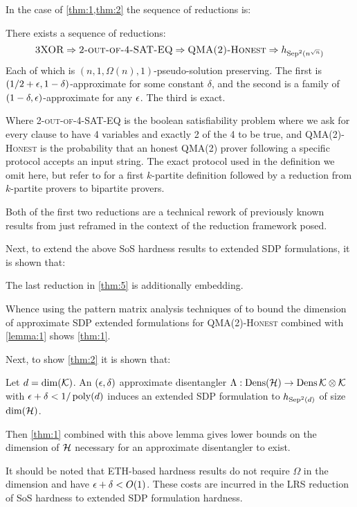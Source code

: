 \documentclass[runningheads,a4paper,english]{llncs}[2022/01/12]
\begin{document}
In the case of \cref{thm:1,thm:2} the sequence of reductions is:
\begin{theorem}\label{thm:5}
  There exists a sequence of reductions:
  \[\textsc{3XOR} \Rightarrow \textsc{2-out-of-4-SAT-EQ} \Rightarrow \textsc{QMA(2)-Honest} \Rightarrow h_{\operatorname{Sep}^2(n^{\sqrt{n}})}\]
  Each of which is $(n, 1, \Omega(n), 1)$-pseudo-solution preserving.
  The first is $(1/2+\epsilon, 1-\delta)$-approximate for some constant $\delta$, and the second is a family of $(1-\delta, \epsilon)$-approximate for any $\epsilon$. The third is exact.
\end{theorem}
Where \textsc{2-out-of-4-SAT-EQ} is the boolean satisfiability problem where we ask for every clause to have 4 variables and exactly 2 of the 4 to be true, and \textsc{QMA(2)-Honest} is the probability that an honest QMA(2) prover following a specific protocol accepts an input string.
The exact protocol used in the definition we omit here, but refer to \cite{aaronson2008powerunentanglement,harrow2013testing} for a first $k$-partite definition followed by a reduction from $k$-partite provers to bipartite provers.

Both of the first two reductions are a technical rework of previously known results from \cite{aaronson2008powerunentanglement,harrow2013testing} just reframed in the context of the reduction framework posed.

Next, to extend the above SoS hardness results to extended SDP formulations, it is shown that:
\begin{lemma}\label{lemma:1}
  The last reduction in \cref{thm:5} is additionally embedding.
\end{lemma}
Whence using the pattern matrix analysis techniques of \cite{lee2014lowerboundssizesemidefinite} to bound the dimension of approximate SDP extended formulations for \textsc{QMA(2)-Honest} combined with \cref{lemma:1} shows \cref{thm:1}.

Next, to show \cref{thm:2} it is shown that:
\begin{lemma}\label{lemma:2}
  Let $d = \dim(\mathcal{K})$. An $(\epsilon, \delta)$ approximate disentangler $\Lambda : \operatorname{Dens}(\mathcal{H}) \to \operatorname{Dens}{\mathcal{K} \otimes \mathcal{K}}$ with $\epsilon + \delta < 1/\operatorname{poly}(d)$ induces an extended SDP formulation to $h_{\operatorname{Sep}^2(d)}$ of size $\dim(\mathcal{H})$.
\end{lemma}
Then \cref{thm:1} combined with this above lemma gives lower bounds on the dimension of $\mathcal{H}$ necessary for an approximate disentangler to exist.

It should be noted that ETH-based hardness results do not require $\Omega$ in the dimension and have $\epsilon + \delta < O(1)$. These costs are incurred in the LRS reduction of SoS hardness to extended SDP formulation hardness.
\end{document}
